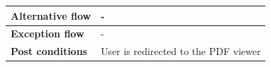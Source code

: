 \documentclass[a4paper]{article}
\begin{document}
\begin{center}
\begin{table}[h]
{\begin{tabular}{|l|l|}
                \textbf{Alternative flow} & -                                                                                                                                                                                                              \\ \hline
                \textbf{Exception flow}   & -                                                                                                                                                                                                              \\ \hline
                \textbf{Post conditions}  & User is redirected to the PDF viewer                                                                                                                                                                           \\ \hline
                \end{tabular}%
                }
            \end{table}
            \vspace{1cm}


\end{center}
\end{document}

